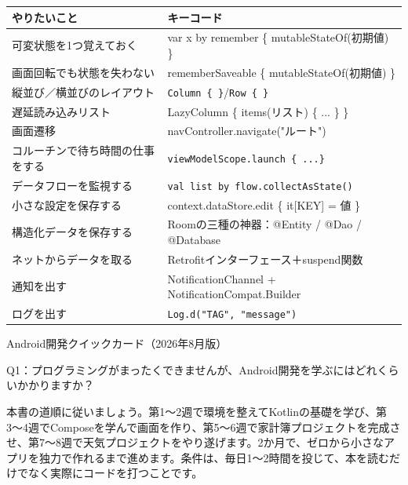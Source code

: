 


\begin{center}
\begin{tabularx}{\linewidth}{|X|X|}
\hline
\textbf{やりたいこと} & \textbf{キーコード} \tabularnewline
\hline
可変状態を1つ覚えておく & var x by remember \{ mutableStateOf(初期値) \} \tabularnewline
画面回転でも状態を失わない & rememberSaveable \{ mutableStateOf(初期値) \} \tabularnewline
縦並び／横並びのレイアウト & \texttt{Column \{ \}}/\texttt{Row \{ \}} \tabularnewline
遅延読み込みリスト & LazyColumn \{ items(リスト) \{ ... \} \} \tabularnewline
画面遷移 & navController.navigate("ルート") \tabularnewline
コルーチンで待ち時間の仕事をする & \texttt{viewModelScope.\allowbreak launch \{ .\allowbreak .\allowbreak .\allowbreak  \}} \tabularnewline
データフローを監視する & \texttt{val list by flow.\allowbreak collectAsState()} \tabularnewline
小さな設定を保存する & context.dataStore.edit \{ it[KEY] = 値 \} \tabularnewline
構造化データを保存する & Roomの三種の神器：@Entity / @Dao / @Database \tabularnewline
ネットからデータを取る & Retrofitインターフェース＋suspend関数 \tabularnewline
通知を出す & NotificationChannel + NotificationCompat.Builder \tabularnewline
ログを出す & \texttt{Log.\allowbreak d("TAG", "message")} \tabularnewline
\hline
\end{tabularx}
\end{center}

\begin{center}\small\color{gray}Android開発クイックカード（2026年8月版）\end{center}


Q1：プログラミングがまったくできませんが、Android開発を学ぶにはどれくらいかかりますか？

本書の道順に従いましょう。第1〜2週で環境を整えてKotlinの基礎を学び、第3〜4週でComposeを学んで画面を作り、第5〜6週で家計簿プロジェクトを完成させ、第7〜8週で天気プロジェクトをやり遂げます。2か月で、ゼロから小さなアプリを独力で作れるまで進めます。条件は、毎日1〜2時間を投じて、本を読むだけでなく実際にコードを打つことです。

